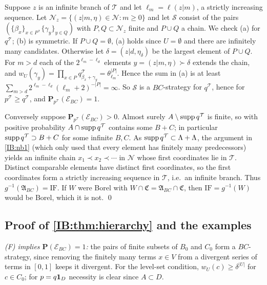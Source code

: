 Suppose $z$ is an infinite branch of $\mathcal T$ and let $\ell_m=\ell(z|m)$, a strictly
increasing sequence. Let $\mathcal N_z=\{(z|m,\eta)\in\mathcal N:m\ge0\}$ and let $\mathcal S$ consist of the
pairs $(\{\beta_x\}_{x\in P},\{\gamma_y\}_{y\in Q})$ with $P,Q\subset\mathcal N_z$ finite and $P\cup Q$ a chain.
We check (a) for $q^{\mathcal T}$; (b) is symmetric. If $P\cup Q=\emptyset$, (a) holds since
$U=\emptyset$ and there are infinitely many candidates. Otherwise let $\delta=(z|d,\eta_\delta)$ be the
largest element of $P\cup Q$. For $m>d$ each of the $2^{\ell_m-\ell_d}$ elements
$y=(z|m,\eta)\succ\delta$ extends the chain, and $w_U(\gamma_y)=\prod_{x\in P}q^{\mathcal T}_{\beta_x+\gamma_y}=\theta_{\ell_m}^{|P|}$.
Hence the sum in (a) is at least $\sum_{m>d}2^{\ell_m-\ell_d}(\ell_m+2)^{-|P|}=\infty$. So $\mathcal S$ is a
$BC$-strategy for $q^{\mathcal T}$, hence for $p^{\mathcal T}\ge q^{\mathcal T}$, and $\mathbf P_{p^{\mathcal T}}(\mathcal E_{BC})=1$.

Conversely suppose $\mathbf P_{p^{\mathcal T}}(\mathcal E_{BC})>0$. Almost surely $A\setminus\operatorname{supp} q^{\mathcal T}$ is finite,
so with positive probability $A\cap\operatorname{supp} q^{\mathcal T}$ contains some $B+C$; in particular
$\operatorname{supp} q^{\mathcal T}\supset B+C$ for some infinite $B,C$. As $\operatorname{supp} q^{\mathcal T}\subset\Lambda+\Lambda$, the argument
in \ref{IB:nb1} (which only used that every element has finitely many predecessors)
yields an infinite chain $x_1\prec x_2\prec\cdots$ in $\mathcal N$ whose first coordinates lie
in $\mathcal T$. Distinct comparable elements have distinct first coordinates, so the
first coordinates form a strictly increasing sequence in $\mathcal T$, i.e.\ an infinite
branch. Thus $g^{-1}(\mathfrak A_{BC})=\mathrm{IF}$. If $W$ were Borel with
$W\cap\mathfrak C=\mathfrak A_{BC}\cap\mathfrak C$, then $\mathrm{IF}=g^{-1}(W)$ would be Borel, which it is not.
\qed

\subsection{Proof of \texorpdfstring{\cref{IB:thm:hierarchy}}{the hierarchy theorem} and the examples}

\emph{(F) implies $\mathbf P(\mathcal E_{BC})=1$:} the pairs of finite subsets of $B_0$ and $C_0$
form a $BC$-strategy, since removing the finitely many terms $x\in V$ from a divergent
series of terms in $[0,1]$ keeps it divergent. For the level-set condition,
$w_U(c)\ge\delta^{|U|}$ for $c\in C_0$; for $p=q\mathbf{1}_D$ necessity is clear since $A\subset D$.

